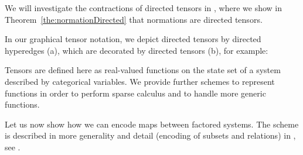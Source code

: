 We will investigate the contractions of directed tensors in , where we show in Theorem~\ref{the:normationDirected} that normations are directed tensors.


In our graphical tensor notation, we depict directed tensors by directed hyperedges (a), which are decorated by directed tensors (b), for example:
	\begin{center}
		
	\end{center}




Tensors are defined here as real-valued functions on the state set of a system described by categorical variables.
We provide further schemes to represent functions in order to perform sparse calculus and to handle more generic functions.



%




Let us now show how we can encode maps between factored systems.
The scheme is described in more generality and detail (encoding of subsets and relations) in , see .

